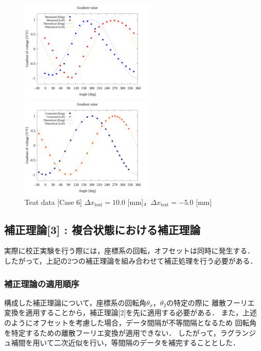 \begin{figure}[htbp]
  \begin{minipage}[b]{0.45\linewidth}
    \centering
    \includegraphics[width=65mm]{../../02_workspace/result/offset_dx=10.0_dy=-5.0/plot/20/20_adjust-value.png}
  \end{minipage}
  \begin{minipage}[b]{0.45\linewidth}
    \centering
    \includegraphics[width=65mm]{../../02_workspace/result/offset_dx=10.0_dy=-5.0/plot/21/21-2_summary_offset.png}
  \end{minipage}
  \caption{Teat data [Case 6] $\Delta x_\mathrm{test} = 10.0$ [mm]，$\Delta x_\mathrm{test} = -5.0$ [mm]}
\end{figure}

\subsection{補正理論[3] : 複合状態における補正理論}

実際に校正実験を行う際には，座標系の回転，オフセットは同時に発生する．
したがって，上記の2つの補正理論を組み合わせて補正処理を行う必要がある．

\subsubsection{補正理論の適用順序}

構成した補正理論について，座標系の回転角$\theta_x$，$\theta_2$の特定の際に
離散フーリエ変換を適用することから，補正理論[2]を先に適用する必要がある．
また，上述のようにオフセットを考慮した場合，データ間隔が不等間隔となるため
回転角を特定するための離散フーリエ変換が適用できない．
したがって，ラグランジュ補間を用いて二次近似を行い，等間隔のデータを補完することとした．

